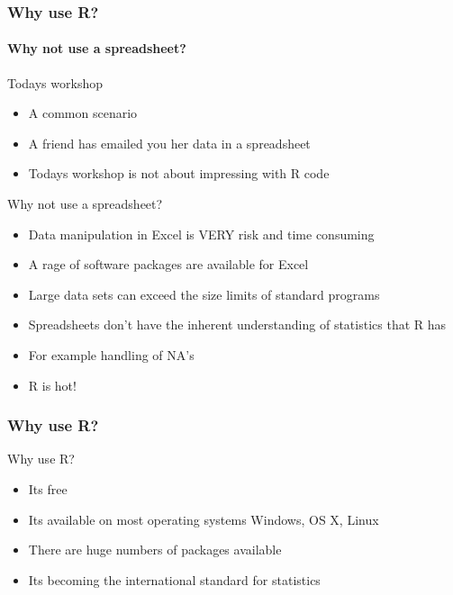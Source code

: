 \documentclass[12pt]{beamer}\usepackage[]{graphicx}\usepackage[]{color}
\begin{document}
\begin{frame}
  \frametitle{Why use R?}
  \framesubtitle{Why not use a spreadsheet?}

\begin{block}{Todays workshop}
\begin{itemize}
\item A common scenario
\item A friend has emailed you her data in a spreadsheet
\item Todays workshop is not about impressing with R code
\end{itemize}

\end{block}
  \begin{block}{Why not use a spreadsheet?}
  \begin{itemize}
    \item Data manipulation in Excel is VERY risk and time consuming
    \item A rage of software packages are available for Excel
    \item Large data sets can exceed the size limits of standard programs
    \item Spreadsheets don't have the inherent understanding of statistics that R has
    \item For example handling of N\/A's
    \item R is hot!
  \end{itemize}
  \end{block}
\end{frame}

\begin{frame}
  \frametitle{Why use R?}
  \begin{block}{Why use R?}
  \begin{itemize}
    \item Its free
    \item Its available on most operating systems Windows, OS X, Linux
    \item There are huge numbers of packages available
    \item Its becoming the international standard for statistics
  \end{itemize}
  \end{block}
\end{frame}

\end{document}
